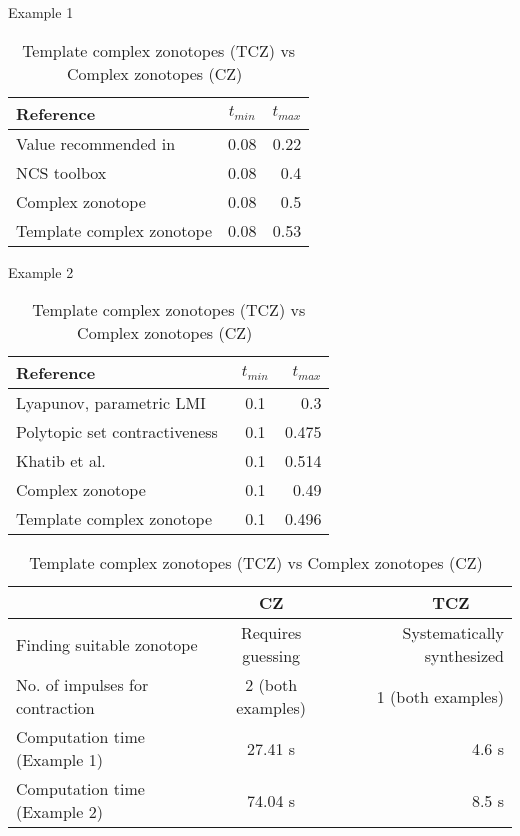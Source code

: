 \begin{table}
\begin{minipage}{0.49\textwidth}
\caption{Example 1}
\begin{tabular}{|l|c|r|}
  \hline
  Reference & $t_{min}$ & $t_{max}$ \\
\hline
Value recommended in~\cite{wittenmark2002computer} & 0.08 & 0.22\\
  \hline
  NCS toolbox~\cite{BauLoo_NECSYS12a} & 0.08 & 0.4 \\
  \hline
Complex zonotope~\cite{arvind2016lis} & 0.08 & 0.5 \\
\hline
  Template complex zonotope & 0.08 & 0.53 \\
  \hline
\end{tabular}
\label{tab:com1}
\end{minipage}
\begin{minipage}{0.49\textwidth}
\caption{Example 2}
\label{tab:com2}
\begin{tabular}{|l|c|r|}
\hline
    Reference & $t_{min}$ & $t_{max}$ \\
  \hline
  Lyapunov, parametric LMI~\cite{2013hetel} & 0.1 & 0.3 \\
  \hline
  Polytopic set contractiveness~\cite{2014-fiacchini-set} & 0.1 & 0.475 \\
  \hline
Khatib et al.~\cite{AlKhatib2015} & 0.1 & 0.514\\
\hline
Complex zonotope~\cite{arvind2016lis} & 0.1 & 0.49 \\
\hline
  Template complex zonotope & 0.1 & 0.496 \\
  \hline
\end{tabular}
\end{minipage}
\vspace{1em}
\caption{Template complex zonotopes (TCZ) vs
    Complex zonotopes (CZ)~\cite{arvind2016lis}}
\center
 \begin{tabular}{|l|c|r|}
  \hline
  $~$ & CZ & TCZ $~~~~~~~~$\\
  \hline
  Finding suitable zonotope & Requires guessing & Systematically synthesized\\
\hline
  No. of impulses for contraction & 2 (both examples) & 1 (both examples)\\
  \hline
    Computation time (Example 1) & 27.41 s & 4.6 s \\
\hline
Computation time (Example 2) & 74.04 s & 8.5 s\\
\hline
\end{tabular}
\label{tab:tcz-cz}
\end{table}






